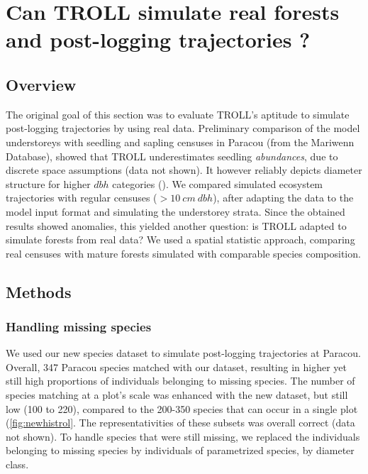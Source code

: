 \documentclass[12pt,]{article}
\let\oldsection\section
\renewcommand\section{\newpage\oldsection}
\theoremstyle{definition}
\theoremstyle{definition}
\theoremstyle{definition}
\theoremstyle{remark}
\begin{document}
\section{Can TROLL simulate real forests and post-logging trajectories
?}\label{can-troll-simulate-real-forests-and-post-logging-trajectories}

\subsection{Overview}\label{overview-1}

The original goal of this section was to evaluate TROLL's aptitude to
simulate post-logging trajectories by using real data. Preliminary
comparison of the model understoreys with seedling and sapling censuses
in Paracou (from the Mariwenn Database), showed that TROLL
underestimates seedling \emph{abundances}, due to discrete space
assumptions (data not shown). It however reliably depicts diameter
structure for higher \(dbh\) categories (\citet{Marechaux2017}). We
compared simulated ecosystem trajectories with regular censuses
(\(>10\ cm\ dbh\)), after adapting the data to the model input format
and simulating the understorey strata. Since the obtained results showed
anomalies, this yielded another question: is TROLL adapted to simulate
forests from real data? We used a spatial statistic approach, comparing
real censuses with mature forests simulated with comparable species
composition.

\subsection{Methods}\label{methods}

\subsubsection{Handling missing species}\label{handling-missing-species}

We used our new species dataset to simulate post-logging trajectories at
Paracou. Overall, 347 Paracou species matched with our dataset,
resulting in higher yet still high proportions of individuals belonging
to missing species. The number of species matching at a plot's scale was
enhanced with the new dataset, but still low (100 to 220), compared to
the 200-350 species that can occur in a single plot
(\ref{fig:newhistrol}. The representativities of these subsets was
overall correct (data not shown). To handle species that were still
missing, we replaced the individuals belonging to missing species by
individuals of parametrized species, by diameter class.
\end{document}
